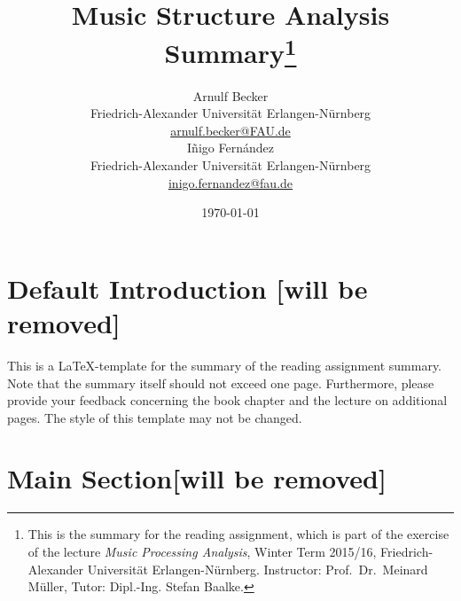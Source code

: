 \documentclass[a4paper, 9pt, twocolumn]{extarticle}
\begin{document}
\date{\normalsize \today}

\title{\vspace{-8mm}\textbf{\Large
Music Structure Analysis Summary\footnote{This is the summary for the reading assignment,
which is part of the exercise of the lecture \emph{Music Processing Analysis}, Winter Term 2015/16,
Friedrich-Alexander Universit\"at Erlangen-N\"urnberg.
Instructor: Prof.\ Dr.\ Meinard M\"uller,
Tutor: Dipl.-Ing. Stefan Baalke.
}}}

\author{
{
\begin{minipage}[t]{.45\textwidth}
\center
Arnulf Becker\\
\small
Friedrich-Alexander Universit\"at Erlangen-N\"urnberg
\protect\\{} %
\url{arnulf.becker@FAU.de}
\end{minipage}%
\begin{minipage}[t]{.45\textwidth}
\center
Iñigo Fern\' andez\\%
\small
Friedrich-Alexander Universit\"at Erlangen-N\"urnberg
\protect\\{} %
\url{inigo.fernandez@fau.de}
\end{minipage}%
}
}
 
\maketitle
\thispagestyle{empty}

\section{Default Introduction [will be removed]}
\label{section:defaultIntroduction}

This is a \LaTeX-template for the summary of the reading assignment summary. Note that the summary
itself should not exceed one page. Furthermore, please provide your feedback concerning the 
book chapter and the lecture on additional pages.
The style of this template may not be changed.



\section{Main Section[will be removed]}
\label{section:main}
\end{document}
